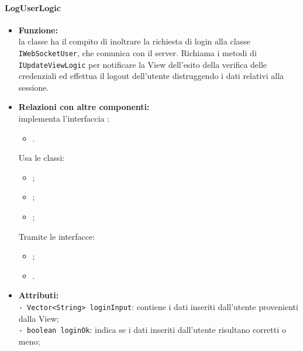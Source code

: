 {{\begin{sloppypar}
{{			\paragraph{LogUserLogic}\label{par:LogUserLogic}{
			\begin{itemize}
				\item[] \textbf{Funzione:}\\
					la classe ha  il compito di inoltrare la richiesta di login alla classe \texttt{IWebSocketUser}, che comunica con il server\g. Richiama i metodi di \texttt{IUpdateViewLogic} per notificare la View dell'esito della verifica delle credenziali ed effettua il logout dell'utente distruggendo i dati relativi alla sessione.\\
				
				\item[] \textbf{Relazioni con altre componenti:}\\
					implementa l'interfaccia :
					\begin{itemize}
						\item[] .
					\end{itemize}							
					Usa le classi:
					\begin{itemize}
						\item[] ;
						\item[] ;
						\item[] ;
					\end{itemize}
					Tramite le interfacce:
					\begin{itemize}	\item[];\\
												\item[].\\

					\end{itemize}
				
				\item[] \textbf{Attributi:}\\
					\texttt{- Vector<String> loginInput}: contiene i dati inseriti dall'utente provenienti dalla View;\\

					\texttt{- boolean loginOk}: indica se i dati inseriti dall'utente risultano corretti o meno;\\


\end{itemize}}}}
\end{sloppypar}}}
